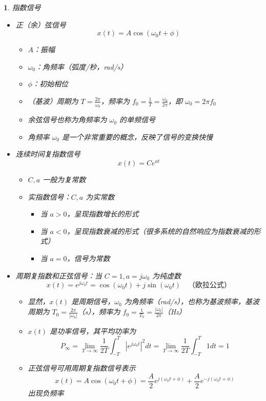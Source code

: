 \documentclass[UTF8]{report}
\theoremstyle{MyLineTheoremStyle} %
\theoremstyle{MyBlockTheoremStyle} %
\theoremstyle{MySubsubsectionStyle} %
\newtheorem{definition}{}
\begin{document}
\begin{definition}
    指数信号
    \begin{itemize}
        \item 正（余）弦信号
        \[
        x(t) = A \cos(\omega_0 t + \phi)
        \]
        \begin{itemize}
            \item $A$：振幅
            \item $\omega_0$：角频率（弧度/秒，rad/s）
            \item $\phi$：初始相位
            \item （基波）周期为 $T = \frac{2\pi}{\omega_0}$，频率为 $f_0 = \frac{1}{T} = \frac{\omega_0}{2\pi}$，即 $\omega_0 = 2\pi f_0$
            \item 余弦信号也称为角频率为 $\omega_0$ 的单频信号
            \item 角频率 $\omega_0$ 是一个非常重要的概念，反映了信号的变换快慢
        \end{itemize}

        \item 连续时间复指数信号
        \[
        x(t) = Ce^{at}
        \]
        \begin{itemize}
            \item $C, a$ 一般为复常数
            \item 实指数信号：$C, a$ 为实常数
            \begin{itemize}
                \item 当 $a > 0$，呈现指数增长的形式
                \item 当 $a < 0$，呈现指数衰减的形式（很多系统的自然响应为指数衰减的形式）
                \item 当 $a = 0$，信号为常数
            \end{itemize}
        \end{itemize}

        \item 周期复指数和正弦信号：当 $C = 1, a = j\omega_0$ 为纯虚数
        \[
        x(t) = e^{j\omega_0 t} = \cos(\omega_0 t) + j \sin(\omega_0 t) \quad \text{（欧拉公式）}
        \]
        \begin{itemize}
            \item 显然，$x(t)$ 是周期信号，$\omega_0$ 为角频率（rad/s），也称为基波频率，基波周期为 $T_0 = \frac{2\pi}{|\omega_0|}$（s），频率为 $f_0 = \frac{1}{T_0} = \frac{|\omega_0|}{2\pi}$（Hz）
            \item $x(t)$ 是功率信号，其平均功率为
            \[
            P_\infty = \lim_{T \to \infty} \frac{1}{2T} \int_{-T}^{T} |e^{j\omega_0 t}|^2 dt = \lim_{T \to \infty} \frac{1}{2T} \int_{-T}^{T} 1 dt = 1
            \]
            \item 正弦信号可用周期复指数信号表示
            \[
            x(t) = A \cos(\omega_0 t + \phi) = \frac{A}{2} e^{j(\omega_0 t + \phi)} + \frac{A}{2} e^{-j(\omega_0 t + \phi)}
            \]
            出现负频率
        \end{itemize}


\end{itemize}
\end{definition}
\end{document}
